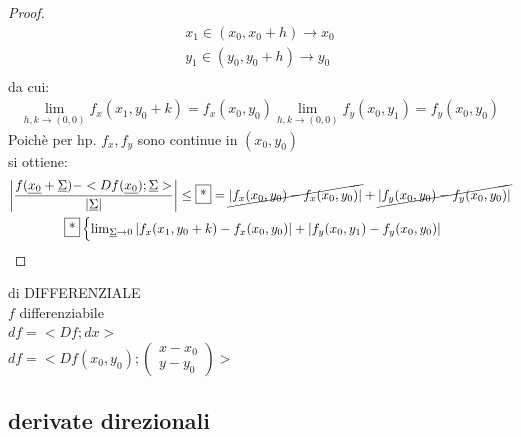 \documentclass[a4paper, oneside]{article}
\begin{document}
\begin{proof}
            \begin{gather*}
                x_1 \in (x_0,x_0+h) \to x_0 \\
                y_1 \in (y_0,y_0+h) \to y_0 \\
            \end{gather*}
            da cui:
            \begin{gather*}
                \lim_{h,k \to (0,0)} f_x (x_1,y_0 +k) = f_x(x_0,y_0)
                \lim_{h,k \to (0,0)} f_y (x_0,y_1) = f_y(x_0,y_0) 
            \end{gather*}
            Poichè per hp. $f_x,f_y$ sono continue in $(x_0,y_0)$\\
            si ottiene:
            \begin{gather*}
                \left| \frac{f(\underline{x_0} + \underline{\Sigma}) - <Df(\underline{x_0}); \underline{\Sigma}>}{ | \underline{\Sigma} |} \right| \leq \text{\fbox{*}} = \cancel{\left| f_x(x_0,y_0)-f_x(x_0,y_0) \right|} + \cancel{\left| f_y(x_0,y_0)-f_y(x_0,y_0) \right|}\\
                \text{\fbox{*}}
                \begin{cases}
                    \lim_{\underline{\Sigma} \to 0} \left| f_x(x_1,y_0+k)-f_x(x_0,y_0) \right| + \left| f_y(x_0,y_1)-f_y(x_0,y_0) \right|
                \end{cases} 
            \end{gather*}
        \end{proof}
        \begin{definition}
            di DIFFERENZIALE\\
            $f$ differenziabile\\
            $df = <Df;dx>$\\
            $df = <Df(x_0,y_0) ; \begin{pmatrix} x-x_0 \\ y-y_0 \end{pmatrix}>$ 
        \end{definition}
        \subsection{derivate direzionali}
    
        \begin{figure}[tbh]
        \centering
        
        \caption{}\label{fig:testsvg}
        \end{figure}
    
\end{document}
